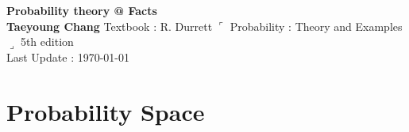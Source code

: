 \documentclass[12pt, A4]{article}
\makeatletter
\newcommand*{\rom}[1]{\expandafter\@slowromancap\romannumeral #1@}
\makeatother
\begin{document}
\begin{titlepage}
	\begin{center}
		\vspace*{5cm}
		\textbf{\Large Probability theory \rom{1} Facts}
		\\
		\vspace{1.5cm}
		\textbf{Taeyoung Chang}
		\vfill
		Textbook : R. Durrett $\ulcorner$ Probability : Theory and Examples $\lrcorner$ 5th edition
		\\
		\vspace{0.8cm}
		Last Update : \today
		\vspace*{3cm}
		\thispagestyle{empty}
	\end{center}
\end{titlepage}
\tableofcontents
\clearpage

\section{Probability Space}
\end{document}

